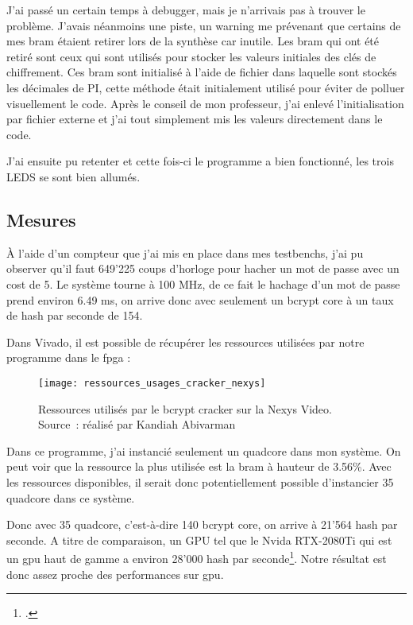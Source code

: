 J'ai passé un certain temps à debugger, mais je n'arrivais pas à trouver le problème. 
J'avais néanmoins une piste, un warning me prévenant que certains de mes \gls{bram} étaient retirer lors de la synthèse car inutile. 
Les \gls{bram} qui ont été retiré sont ceux qui sont utilisés pour stocker les valeurs initiales des clés de chiffrement.
Ces \gls{bram} sont initialisé à l'aide de fichier dans laquelle sont stockés les décimales de PI, cette méthode était initialement utilisé pour éviter de polluer visuellement le code.
Après le conseil de mon professeur, j'ai enlevé l'initialisation par fichier externe et j'ai tout simplement mis les valeurs directement dans le code.

J'ai ensuite pu retenter et cette fois-ci le programme a bien fonctionné, les trois LEDS se sont bien allumés.

\newpage

\subsection{Mesures}

À l'aide d'un compteur que j'ai mis en place dans mes testbenchs, j'ai pu observer qu'il faut 649'225 coups d'horloge pour hacher un mot de passe avec un cost de 5.
Le système tourne à 100 MHz, de ce fait le hachage d'un mot de passe prend environ 6.49 ms, on arrive donc avec seulement un bcrypt core à un taux de hash par seconde de 154.

Dans Vivado, il est possible de récupérer les ressources utilisées par notre programme dans le \gls{fpga} : 

\begin{figure}[tbph!]
	\centering
	\texttt{[image: ressources\_usages\_cracker\_nexys]}
	\caption[Ressources utilisés par le bcrypt cracker sur la Nexys Video]{Ressources utilisés par le bcrypt cracker sur la Nexys Video. Source : réalisé par Kandiah Abivarman}
	\label{fig:ressources_usages_cracker_nexys}
\end{figure}

Dans ce programme, j'ai instancié seulement un quadcore dans mon système. On peut voir que la ressource la plus utilisée est la \gls{bram} à hauteur de 3.56\%. 
Avec les ressources disponibles, il serait donc potentiellement possible d'instancier 35 quadcore dans ce système.

Donc avec 35 quadcore, c'est-à-dire 140 bcrypt core, on arrive à 21'564 hash par seconde. 
A titre de comparaison, un GPU tel que le Nvida RTX-2080Ti qui est un \gls{gpu} haut de gamme a environ 28'000 hash par seconde\footcite{scatteredsecretscom_bcrypt_2020}.
Notre résultat est donc assez proche des performances sur \gls{gpu}.

